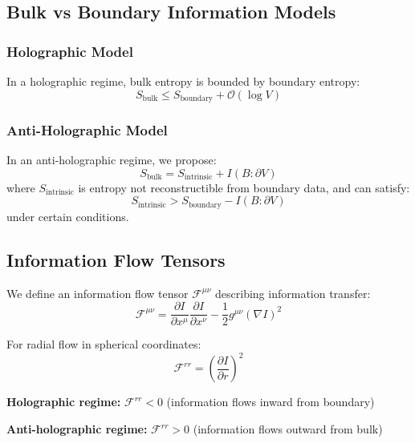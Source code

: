 \documentclass[twocolumn,aps,prd,superscriptaddress,nofootinbib]{revtex4-2}
\begin{document}
\subsection{Bulk vs Boundary Information Models}

\subsubsection{Holographic Model}
In a holographic regime, bulk entropy is bounded by boundary entropy:
\begin{equation}
S_{\text{bulk}} \leq S_{\text{boundary}} + \mathcal{O}(\log V)
\label{eq:holo_entropy_bound}
\end{equation}

\subsubsection{Anti-Holographic Model}
In an anti-holographic regime, we propose:
\begin{equation}
S_{\text{bulk}} = S_{\text{intrinsic}} + I(B:\partial V)
\end{equation}
where $S_{\text{intrinsic}}$ is entropy not reconstructible from boundary data, and can satisfy:
\begin{equation}
S_{\text{intrinsic}} > S_{\text{boundary}} - I(B:\partial V)
\end{equation}
under certain conditions.

\subsection{Information Flow Tensors}

We define an information flow tensor $\mathcal{F}^{\mu\nu}$ describing information transfer:
\begin{equation}
\mathcal{F}^{\mu\nu} = \frac{\partial I}{\partial x^\mu} \frac{\partial I}{\partial x^\nu} - \frac{1}{2} g^{\mu\nu} (\nabla I)^2
\end{equation}

For radial flow in spherical coordinates:
\begin{equation}
\mathcal{F}^{rr} = \left(\frac{\partial I}{\partial r}\right)^2
\end{equation}

\textbf{Holographic regime:} $\mathcal{F}^{rr} < 0$ (information flows inward from boundary)

\textbf{Anti-holographic regime:} $\mathcal{F}^{rr} > 0$ (information flows outward from bulk)
\end{document}
